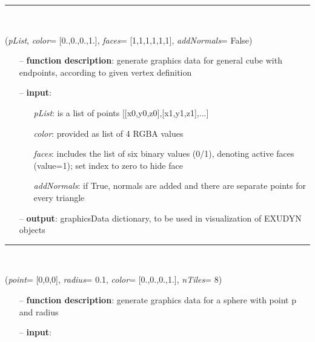\begin{itemize}[leftmargin=1.4cm]
\begin{itemize}[leftmargin=1.4cm]
\begin{itemize}[leftmargin=0.5cm]
\begin{itemize}[leftmargin=1.4cm]
\begin{itemize}[leftmargin=1.4cm]
\begin{itemize}[leftmargin=0.5cm]
\begin{itemize}[leftmargin=1.4cm]
\begin{itemize}[leftmargin=0.5cm]
%
\noindent\rule{8cm}{0.75pt}\vspace{1pt} \\ 
\begin{flushleft}
\label{sec:graphicsDataUtilities:GraphicsDataCube}
({\it pList}, {\it color}= [0.,0.,0.,1.], {\it faces}= [1,1,1,1,1,1], {\it addNormals}= False)
\end{flushleft}
\setlength{\itemindent}{0.7cm}
\begin{itemize}[leftmargin=0.7cm]
  \item[--]  {\bf function description}: generate graphics data for general cube with endpoints, according to given vertex definition  \item[--]  {\bf input}: \vspace{-6pt}
  \begin{itemize}[leftmargin=1.2cm]
\setlength{\itemindent}{-0.7cm}
    \item[] {\it pList}: is a list of points [[x0,y0,z0],[x1,y1,z1],...]
    \item[] {\it   color}: provided as list of 4 RGBA values
    \item[] {\it   faces}: includes the list of six binary values (0/1), denoting active faces (value=1); set index to zero to hide face
    \item[] {\it   addNormals}: if True, normals are added and there are separate points for every triangle
  \end{itemize}
  \item[--]  {\bf output}: graphicsData dictionary, to be used in visualization of EXUDYN objects\vspace{12pt}\end{itemize}
%
\noindent\rule{8cm}{0.75pt}\vspace{1pt} \\ 
\begin{flushleft}
\label{sec:graphicsDataUtilities:GraphicsDataSphere}
({\it point}= [0,0,0], {\it radius}= 0.1, {\it color}= [0.,0.,0.,1.], {\it nTiles}= 8)
\end{flushleft}
\setlength{\itemindent}{0.7cm}
\begin{itemize}[leftmargin=0.7cm]
  \item[--]  {\bf function description}: generate graphics data for a sphere with point p and radius  \item[--]  {\bf input}: \vspace{-6pt}

\end{itemize}
\end{itemize}
\end{itemize}
\end{itemize}
\end{itemize}
\end{itemize}
\end{itemize}
\end{itemize}
\end{itemize}
